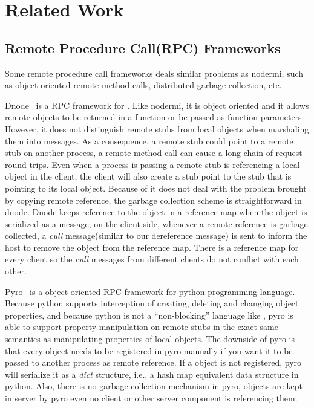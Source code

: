 \chapter{Related Work}

\section{Remote Procedure Call(RPC) Frameworks}
\label{sec:relatedrpc}
Some remote procedure call frameworks deals similar problems as nodermi,
such as object oriented remote method calls,
distributed garbage collection, etc.

Dnode~\cite{dnode} is a RPC framework for \nodejs{}. 
Like nodermi, it is object oriented and it allows remote objects to be 
returned in a function or be passed as function parameters.
However, it does not distinguish remote stubs from local objects 
when marshaling them into messages.
As a consequence, a remote stub could point to a remote stub on another process,
a remote method call can cause a long chain of request round trips.
Even when a process is passing a remote stub is referencing a local object in the client,
the client will also create a stub point to the stub that is pointing to its local object.
Because of it does not deal with the problem brought by copying remote reference,
the garbage collection scheme is straightforward in dnode.
Dnode keeps reference to the object in a reference map when the object
 is serialized as a message,
on the client side,
whenever a remote reference is garbage collected, 
a \emph{cull} message(similar to our dereference message) 
is sent to inform the host to remove the object from 
the reference map.
There is a reference map for every client so the \emph{cull} messages from
different clients do not conflict with each other.
 
Pyro~\cite{pyro} is a object oriented RPC framework for python programming language.
Because python supports interception of creating, deleting and changing object properties,
and because python is not a ``non-blocking'' language like \js{},
pyro is able to support property manipulation on remote stubs in the exact same semantics as manipulating 
properties of local objects.
The downside of pyro is that every object needs to be registered in pyro manually
if you want it to be passed to another process as remote reference.
If a object is not registered,
pyro will serialize it as a \emph{dict} structure, i.e., a hash map equivalent data structure in python.
Also, there is no garbage collection mechanism in pyro, 
objects are kept in server by pyro even no client or other server component is referencing them.

